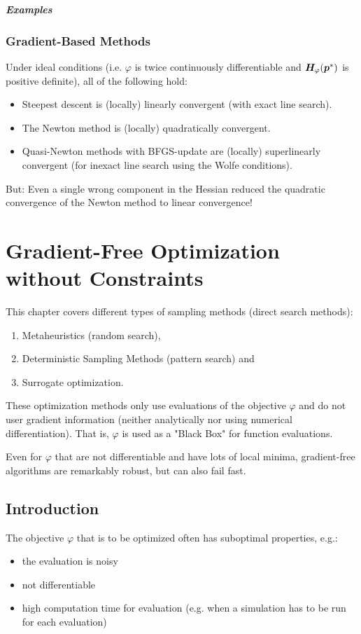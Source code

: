 		\paragraph{Examples} %

		\subsection{Gradient-Based Methods}
			Under ideal conditions (i.e. \(\varphi\) is twice continuously differentiable and \( \bm{H}_\varphi(\bm{p}^\ast) \) is positive definite), all of the following hold:
			\begin{itemize}
				\item Steepest descent is (locally) linearly convergent (with exact line search).
				\item The Newton method is (locally) quadratically convergent.
				\item Quasi-Newton methods with BFGS-update are (locally) superlinearly convergent (for inexact line search using the Wolfe conditions).
			\end{itemize}
			But: Even a single wrong component in the Hessian reduced the quadratic convergence of the Newton method to linear convergence!

\chapter{Gradient-Free Optimization without Constraints}
	This chapter covers different types of sampling methods (direct search methods):
	\begin{enumerate}
		\item Metaheuristics (random search),
		\item Deterministic Sampling Methods (pattern search) and
		\item Surrogate optimization.
	\end{enumerate}
	These optimization methods only use evaluations of the objective \(\varphi\) and do not user gradient information (neither analytically nor using numerical differentiation). That is, \(\varphi\) is used as a "Black Box" for function evaluations.

	Even for \(\varphi\) that are not differentiable and have lots of local minima, gradient-free algorithms are remarkably robust, but can also fail fast.

	\section{Introduction}
		The objective \(\varphi\) that is to be optimized often has suboptimal properties, e.g.:
		\begin{itemize}
			\item the evaluation is noisy
			\item not differentiable
			\item high computation time for evaluation (e.g. when a simulation has to be run for each evaluation)
		\end{itemize}

